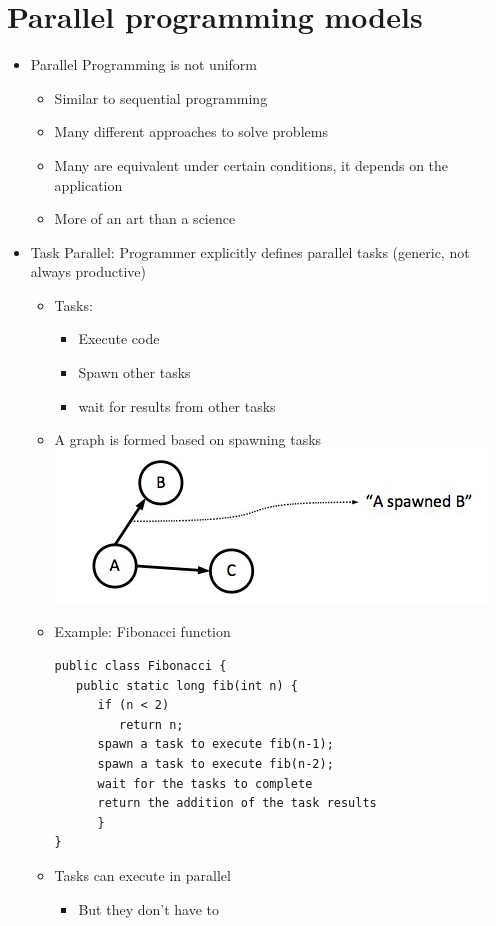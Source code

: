 \documentclass[a4paper]{article}
\begin{document}
\section{Parallel programming models}
\begin{itemize}
\item Parallel Programming is not uniform
\begin{itemize}
\item Similar to sequential programming
\item Many different approaches to solve problems
\item Many are equivalent under certain conditions, it depends on the application
\item More of an art than a science
\end{itemize}
\item Task Parallel: Programmer explicitly defines parallel tasks (generic, not always productive)
\begin{itemize}
\item Tasks:
\begin{itemize}
\item Execute code
\item Spawn other tasks
\item wait for results from other tasks
\end{itemize}
\item A graph is formed based on spawning tasks\\\includegraphics[scale=0.5]{Figures/chapter4slide7.jpg}
\item Example: Fibonacci function 
\begin{lstlisting}
public class Fibonacci {
   public static long fib(int n) {
      if (n < 2)
         return n;
      spawn a task to execute fib(n-1);
      spawn a task to execute fib(n-2);
      wait for the tasks to complete
      return the addition of the task results
      } 
}
\end{lstlisting}
\item Tasks can execute in parallel
\begin{itemize}
\item But they don't have to

\end{itemize}
\end{itemize}
\end{itemize}
\end{document}
